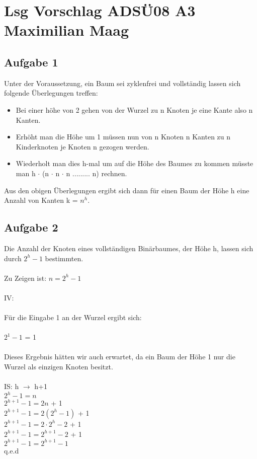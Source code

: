 \documentclass{article}
\begin{document}
	\section*{Lsg Vorschlag ADSÜ08 A3 Maximilian Maag}
	
	\subsection*{Aufgabe 1}
	Unter der Voraussetzung, ein Baum sei zyklenfrei und vollständig lassen sich folgende Überlegungen treffen: \\
	\begin{itemize}
		\item Bei einer höhe von 2 gehen von der Wurzel zu n Knoten je eine Kante also n Kanten.
		\item Erhöht man die Höhe um 1 müssen nun von n Knoten n Kanten zu n Kinderknoten je Knoten n gezogen werden.
		\item Wiederholt man dies h-mal um auf  die Höhe des Baumes zu kommen müsste man h $\cdot$ (n $\cdot$ n $\cdot$ n ......... n) rechnen.
	\end{itemize}
	Aus den obigen Überlegungen ergibt sich dann für einen Baum der Höhe h eine Anzahl von Kanten k = $n^{h}$.
	\subsection*{Aufgabe 2}
	Die Anzahl der Knoten eines vollständigen Binärbaumes, der Höhe h, lassen sich durch $2^{h} - 1$ bestimmten. \\ \\
	Zu Zeigen ist: $n = 2^{h} - 1$ \\ \\
	IV: \\ \\
	Für die Eingabe 1 an der Wurzel ergibt sich: \\ \\
	$2^{1} - 1$ = 1 \\ \\
	Dieses Ergebnis hätten wir auch erwartet, da ein Baum der Höhe 1 nur die Wurzel als einzigen Knoten besitzt. \\ \\
	IS: h $\to$ h+1 \\
	$2^{h} - 1 = n$ \\
	$2^{h+1} - 1 = 2n$ + 1 \\
	$2^{h+1} - 1 = 2(2^{h} - 1)$ + 1 \\
	$2^{h+1} - 1 = 2 \cdot 2^{h} - 2$  + 1\\
	$2^{h+1} - 1 = 2^{h+1} - 2$  + 1\\
	$2^{h+1} - 1 = 2^{h+1} - 1$ \\
	q.e.d
	
\end{document}

